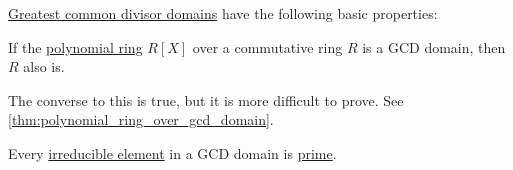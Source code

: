 \begin{proposition}\label{thm:def:gcd_domain}
  \hyperref[def:gcd_domain]{Greatest common divisor domains} have the following basic properties:
  \begin{thmenum}
     If the \hyperref[def:polynomial_algebra]{polynomial ring} \( R[X] \) over a commutative ring \( R \) is a GCD domain, then \( R \) also is.

    The converse to this is true, but it is more difficult to prove. See \cref{thm:polynomial_ring_over_gcd_domain}.

     Every \hyperref[def:domain_divisibility/irreducible]{irreducible element} in a GCD domain is \hyperref[def:domain_divisibility/prime]{prime}.
  \end{thmenum}
\end{proposition}
